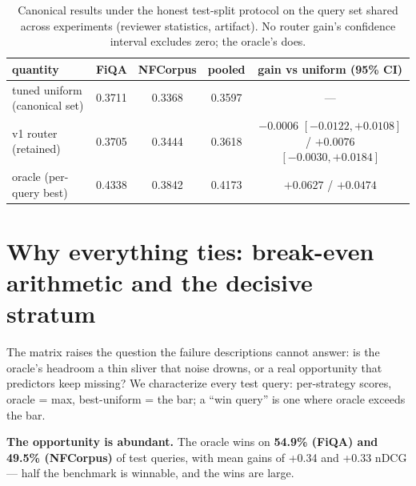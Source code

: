 \documentclass[11pt]{article}
\begin{document}
\begin{table}[H]
\centering\small
\begin{tabular}{lcccc}
\toprule
quantity & FiQA & NFCorpus & pooled & gain vs uniform (95\% CI) \\
\midrule
tuned uniform (canonical set) & 0.3711 & 0.3368 & 0.3597 & --- \\
v1 router (retained) & 0.3705 & 0.3444 & 0.3618 & $-0.0006$ $[-0.0122, +0.0108]$ / $+0.0076$ $[-0.0030, +0.0184]$ \\
oracle (per-query best) & 0.4338 & 0.3842 & 0.4173 & $+0.0627$ / $+0.0474$ \\
\bottomrule
\end{tabular}
\caption{Canonical results under the honest test-split protocol on the query set shared across experiments (reviewer statistics, artifact). No router gain's confidence interval excludes zero; the oracle's does.}
\label{tab:canonical}
\end{table}
\section{Why everything ties: break-even arithmetic and the decisive stratum}
The matrix raises the question the failure descriptions cannot answer: is the oracle's headroom a thin sliver that noise drowns, or a real opportunity that predictors keep missing? We characterize every test query: per-strategy scores, oracle = max, best-uniform = the bar; a ``win query'' is one where oracle exceeds the bar.

\textbf{The opportunity is abundant.} The oracle wins on \textbf{54.9\% (FiQA) and 49.5\% (NFCorpus)} of test queries, with mean gains of +0.34 and +0.33 nDCG --- half the benchmark is winnable, and the wins are large.
\end{document}
